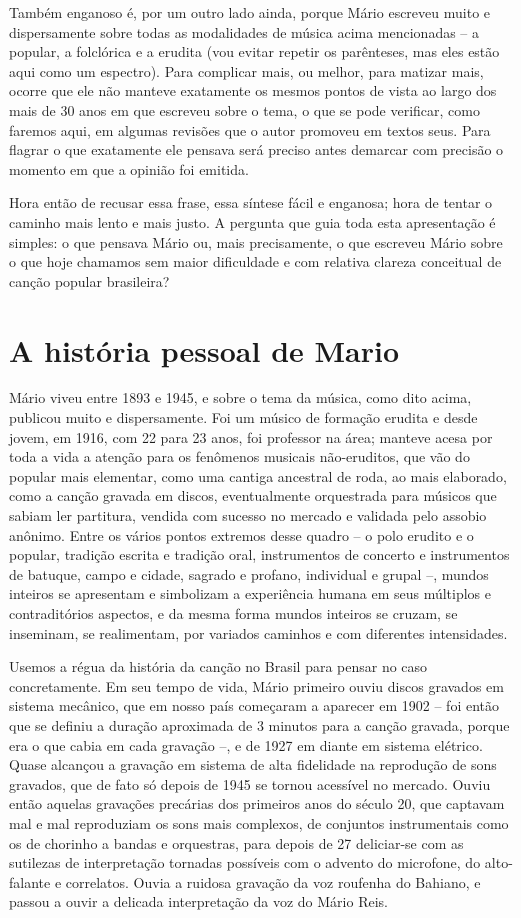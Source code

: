 Também enganoso é, por um outro lado ainda, porque Mário escreveu muito
e dispersamente sobre todas as modalidades de música acima mencionadas
-- a popular, a folclórica e a erudita (vou evitar repetir os
parênteses, mas eles estão aqui como um espectro). Para complicar mais,
ou melhor, para matizar mais, ocorre que ele não manteve exatamente os
mesmos pontos de vista ao largo dos mais de 30 anos em que escreveu
sobre o tema, o que se pode verificar, como faremos aqui, em algumas
revisões que o autor promoveu em textos seus. Para flagrar o que
exatamente ele pensava será preciso antes demarcar com precisão o
momento em que a opinião foi emitida.

Hora então de recusar essa frase, essa síntese fácil e enganosa; hora de
tentar o caminho mais lento e mais justo. A pergunta que guia toda esta
apresentação é simples: o que pensava Mário ou, mais precisamente, o que
escreveu Mário sobre o que hoje chamamos sem maior dificuldade e com
relativa clareza conceitual de canção popular brasileira?

\chapter{A história pessoal de Mario}

Mário viveu entre 1893 e 1945, e sobre o tema da música, como dito
acima, publicou muito e dispersamente. Foi um músico de formação erudita
e desde jovem, em 1916, com 22 para 23 anos, foi professor na área;
manteve acesa por toda a vida a atenção para os fenômenos musicais
não-eruditos, que vão do popular mais elementar, como uma cantiga
ancestral de roda, ao mais elaborado, como a canção gravada em discos,
eventualmente orquestrada para músicos que sabiam ler partitura, vendida
com sucesso no mercado e validada pelo assobio anônimo. Entre os vários
pontos extremos desse quadro -- o polo erudito e o popular, tradição
escrita e tradição oral, instrumentos de concerto e instrumentos de
batuque, campo e cidade, sagrado e profano, individual e grupal --,
mundos inteiros se apresentam e simbolizam a experiência humana em seus
múltiplos e contraditórios aspectos, e da mesma forma mundos inteiros se
cruzam, se inseminam, se realimentam, por variados caminhos e com
diferentes intensidades.

Usemos a régua da história da canção no Brasil para pensar no caso
concretamente. Em seu tempo de vida, Mário primeiro ouviu discos
gravados em sistema mecânico, que em nosso país começaram a aparecer em
1902 -- foi então que se definiu a duração aproximada de 3 minutos para
a canção gravada, porque era o que cabia em cada gravação --, e de 1927
em diante em sistema elétrico. Quase alcançou a gravação em sistema de
alta fidelidade na reprodução de sons gravados, que de fato só depois de
1945 se tornou acessível no mercado. Ouviu então aquelas gravações
precárias dos primeiros anos do século 20, que captavam mal e mal
reproduziam os sons mais complexos, de conjuntos instrumentais como os
de chorinho a bandas e orquestras, para depois de 27 deliciar-se com as
sutilezas de interpretação tornadas possíveis com o advento do
microfone, do alto-falante e correlatos. Ouvia a ruidosa gravação da voz
roufenha do Bahiano, e passou a ouvir a delicada interpretação da voz do
Mário Reis.

